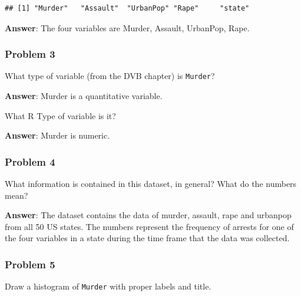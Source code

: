 \documentclass[
]{article}
\newenvironment{Shaded}{\begin{snugshade}}{\end{snugshade}}
\newcommand{\AttributeTok}[1]{\textcolor[rgb]{0.77,0.63,0.00}{#1}}
\newcommand{\DecValTok}[1]{\textcolor[rgb]{0.00,0.00,0.81}{#1}}
\newcommand{\FunctionTok}[1]{\textcolor[rgb]{0.00,0.00,0.00}{#1}}
\newcommand{\NormalTok}[1]{#1}
\newcommand{\SpecialCharTok}[1]{\textcolor[rgb]{0.00,0.00,0.00}{#1}}
\newcommand{\StringTok}[1]{\textcolor[rgb]{0.31,0.60,0.02}{#1}}
\begin{document}
\begin{verbatim}
## [1] "Murder"   "Assault"  "UrbanPop" "Rape"     "state"
\end{verbatim}

\textbf{Answer}: The four variables are Murder, Assault, UrbanPop, Rape.

\hypertarget{problem-3}{%
\subsubsection{Problem 3}\label{problem-3}}

What type of variable (from the DVB chapter) is \texttt{Murder}?

\textbf{Answer}: Murder is a quantitative variable.

What R Type of variable is it?

\textbf{Answer}: Murder is numeric.

\hypertarget{problem-4}{%
\subsubsection{Problem 4}\label{problem-4}}

What information is contained in this dataset, in general? What do the
numbers mean?

\textbf{Answer}: The dataset contains the data of murder, assault, rape
and urbanpop from all 50 US states. The numbers represent the frequency
of arrests for one of the four variables in a state during the time
frame that the data was collected.

\hypertarget{problem-5}{%
\subsubsection{Problem 5}\label{problem-5}}

Draw a histogram of \texttt{Murder} with proper labels and title.

\begin{Shaded}
\end{Shaded}
\end{document}
